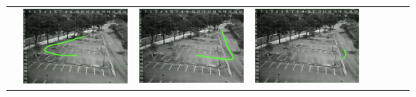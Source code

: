 \begin{landscape}
\begin{table}[]
{\begin{tabular}{|l||l|l|l|l|l|l|l|}
 & \includegraphics[scale=0.25]{image/suppResults/q1.PNG}
 & \includegraphics[scale=0.25]{image/suppResults/q2.PNG}
 & \includegraphics[scale=0.25]{image/suppResults/q3.PNG}

\end{tabular}}
\end{table}
\end{landscape}
